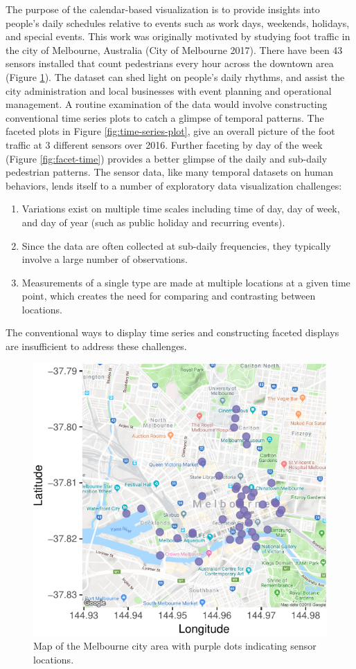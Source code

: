 The purpose of the calendar-based visualization is to provide insights
into people's daily schedules relative to events such as work days,
weekends, holidays, and special events. This work was originally
motivated by studying foot traffic in the city of Melbourne, Australia
(City of Melbourne 2017). There have been 43 sensors installed that
count pedestrians every hour across the downtown area (Figure
\ref{fig:ped-map}). The dataset can shed light on people's daily
rhythms, and assist the city administration and local businesses with
event planning and operational management. A routine examination of the
data would involve constructing conventional time series plots to catch
a glimpse of temporal patterns. The faceted plots in Figure
\ref{fig:time-series-plot}, give an overall picture of the foot traffic
at 3 different sensors over 2016. Further faceting by day of the week
(Figure \ref{fig:facet-time}) provides a better glimpse of the daily and
sub-daily pedestrian patterns. The sensor data, like many temporal
datasets on human behaviors, lends itself to a number of exploratory
data visualization challenges:

\begin{enumerate}
\def\labelenumi{\arabic{enumi}.}
\tightlist
\item
  Variations exist on multiple time scales including time of day, day of
  week, and day of year (such as public holiday and recurring events).
\item
  Since the data are often collected at sub-daily frequencies, they
  typically involve a large number of observations.
\item
  Measurements of a single type are made at multiple locations at a
  given time point, which creates the need for comparing and contrasting
  between locations.
\end{enumerate}

The conventional ways to display time series and constructing faceted
displays are insufficient to address these challenges.

\begin{Schunk}
\begin{figure}

{\centering \includegraphics[width=0.55\linewidth]{figure/ped-map-1} 

}

\caption[Map of the Melbourne city area with purple dots indicating sensor locations]{Map of the Melbourne city area with purple dots indicating sensor locations.}\label{fig:ped-map}
\end{figure}
\end{Schunk}

